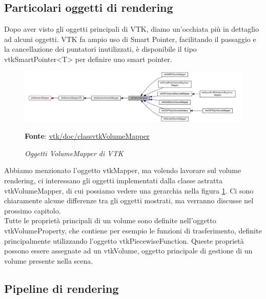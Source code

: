 \subsection{Particolari oggetti di rendering}\label{sec:special-rendering}
Dopo aver visto gli oggetti principali di VTK, diamo un'occhiata più in dettaglio ad alcuni oggetti. VTK fa ampio uso di Smart Pointer, facilitando il passaggio e la cancellazione dei puntatori inutilizzati, è disponibile il tipo vtkSmartPointer<T> per definire uno smart pointer.

\begin{figure}[h]
    \centering
    \includegraphics[scale=0.4]{immagini/volumerendering/mappers.png}
    \caption{\textit{Oggetti VolumeMapper di VTK}}
    \textbf{Fonte}: \href{https://vtk.org/doc/nightly/html/classvtkVolumeMapper.html}{vtk/doc/classvtkVolumeMapper}
    \label{fig: Gerarchia di VolumeMapper}
\end{figure}

Abbiamo menzionato l'oggetto vtkMapper, ma volendo lavorare sul volume rendering, ci interessano gli oggetti implementati dalla classe astratta vtkVolumeMapper, di cui possiamo vedere una gerarchia nella figura \ref{fig: Gerarchia di VolumeMapper}. Ci sono chiaramente alcune differenze tra gli oggetti mostrati, ma verranno discusse nel prossimo capitolo.
\\
Tutte le proprietà principali di un volume sono definite nell'oggetto vtkVolumeProperty, che contiene per esempio le funzioni di trasferimento, definite principalmente utilizzando l'oggetto vtkPiecewiseFunction. Queste proprietà possono essere assegnate ad un vtkVolume, oggetto principale di gestione di un volume presente nella scena.

\subsection{Pipeline di rendering}

